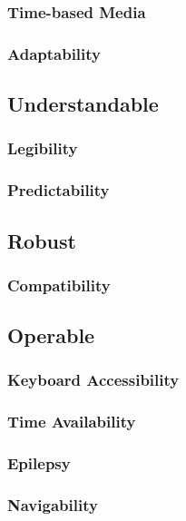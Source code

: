 \documentclass[10pt, a4paper]{article}
\begin{document}
\subsubsection{Time-based Media}

\subsubsection{Adaptability}

\subsection{Understandable}

\subsubsection{Legibility}

\subsubsection{Predictability}

\subsection{Robust}

\subsubsection{Compatibility}

\subsection{Operable}

\subsubsection{Keyboard Accessibility}

\subsubsection{Time Availability}

\subsubsection{Epilepsy}

\subsubsection{Navigability}
\end{document}
